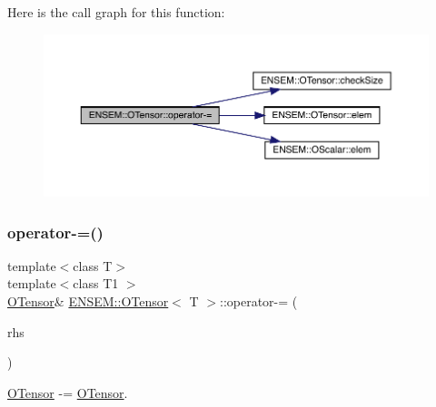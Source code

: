 Here is the call graph for this function\+:
\nopagebreak
\begin{figure}[H]
\begin{center}
\leavevmode
\includegraphics[width=350pt]{da/d8a/classENSEM_1_1OTensor_a61ebd11eac882623ea080293b007972b_cgraph}
\end{center}
\end{figure}
\mbox{\label{classENSEM_1_1OTensor_a8a087d8889bb41eafd237e270e4182fa}} 
\subsubsection{\texorpdfstring{operator-\/=()}{operator-=()}\hspace{0.1cm}{\footnotesize\ttfamily [3/4]}}
{\footnotesize\ttfamily template$<$class T$>$ \\
template$<$class T1 $>$ \\
\mbox{\hyperlink{classENSEM_1_1OTensor}{O\+Tensor}}\& \mbox{\hyperlink{classENSEM_1_1OTensor}{E\+N\+S\+E\+M\+::\+O\+Tensor}}$<$ T $>$\+::operator-\/= (\begin{DoxyParamCaption}\item[{const \mbox{\hyperlink{classENSEM_1_1OTensor}{O\+Tensor}}$<$ T1 $>$ \&}]{rhs }\end{DoxyParamCaption})\hspace{0.3cm}{\ttfamily [inline]}}



\mbox{\hyperlink{classENSEM_1_1OTensor}{O\+Tensor}} -\/= \mbox{\hyperlink{classENSEM_1_1OTensor}{O\+Tensor}}. 

